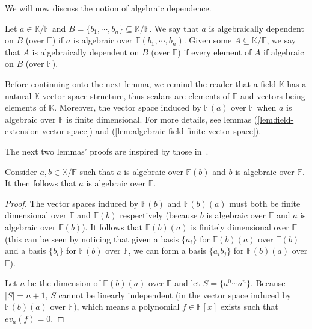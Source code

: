 We will now discuss the notion of algebraic dependence.

\begin{defn}
	Let $a \in \mathbb K / \mathbb F$ and $B = \{b _1, \cdots, b _n \} \subseteq  \mathbb K / \mathbb F$. We say that $a$ is algebraically dependent on $B$ (over $ \mathbb{F} $) if $a$ is algebraic over $\mathbb F(b _1, \cdots, b _n )$. Given some $A \subseteq  \mathbb K / \mathbb{F} $, we say that $A$ is algebraically dependent on $B$ (over $\mathbb{F} $) if every element of $A$ if algebraic on $B$ (over $\mathbb{F} $).
\end{defn}

Before continuing onto the next lemma, we remind the reader that a field $\mathbb{K}$ has a natural $\mathbb{K}$-vector space structure, thus scalars are elements of $\mathbb{F} $ and vectors being elements of $\mathbb K$. Moreover, the vector space induced by $\mathbb{F} (a)$ over $\mathbb{F} $ when $a$ is algebraic over $\mathbb{F} $ is finite dimensional. For more details, see lemmas (\ref{lem:field-extension-vector-space}) and (\ref{lem:algebraic-field-finite-vector-space}).

The next two lemmas' proofs are inspired by those in~\cite[p. 213]{oxley1}.

\begin{lemma}\label{lem:algebraic-transitivity}
	Consider $a, b \in \mathbb K / \mathbb{F} $ such that $a$ is algebraic over $\mathbb{F}(b) $ and $b$ is algebraic over $\mathbb{F}$. It then follows that $a$ is algebraic over $\mathbb{F}$.
\end{lemma}

\begin{proof}
	The vector spaces induced by $\mathbb{F} (b)$ and $\mathbb{F} (b)(a)$ must both be finite dimensional over $\mathbb{F} $ and $\mathbb{F} (b)$ respectively (because $b$ is algebraic over $\mathbb{F} $ and $a$ is algebraic over $\mathbb{F} (b)$). It follows that $\mathbb{F} (b)(a)$ is finitely dimensional over $\mathbb{F}$ (this can be seen by noticing that given a basis $\{a _i \}$ for $\mathbb{F} (b)(a)$ over $\mathbb{F} (b)$ and a basis $\{b _i\}$ for $\mathbb{F} (b)$ over $\mathbb{F} $, we can form a basis $\{a _i b _j\}$ for $\mathbb{F} (b)(a)$ over $\mathbb{F} $).

	Let $n$ be the dimension of $\mathbb{F} (b)(a)$ over $\mathbb{F} $ and let $S = \{a ^0 \cdots a ^n \}$. Because $|S| = n + 1$, $S$ cannot be linearly independent (in the vector space induced by $\mathbb{F} (b)(a)$ over $\mathbb{F} $), which means a polynomial $f \in \mathbb{F} [x]$ exists such that $ev_a(f) = 0$.
\end{proof}

